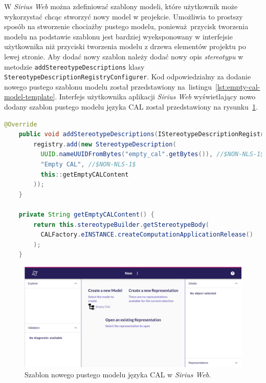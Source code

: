 W \emph{Sirius Web} można zdefiniować szablony modeli, które użytkownik może
wykorzystać chcąc stworzyć nowy model w projekcie. Umożliwia to prostszy
sposób na stworzenie chociażby pustego modelu, ponieważ przycisk tworzenia
modelu
na podstawie szablonu jest bardziej wyeksponowany w interfejsie użytkownika niż
przyciski tworzenia modelu z drzewa elementów projektu po lewej stronie.
Aby dodać nowy szablon należy dodać nowy opis \emph{stereotypu} w metodzie
\texttt{addStereotypeDescriptions} klasy
\texttt{StereotypeDescriptionRegistryConfigurer}. Kod odpowiedzialny za dodanie
nowego pustego szablonu modelu został przedstawiony
na~listingu~\ref{lst:empty-cal-model-template}. Interfejs użytkownika aplikacji
\emph{Sirius Web} wyświetlający nowo dodany szablon pustego modelu języka
\gls{CAL} został przedstawiony na
rysunku~\ref{rys:sirius-web-new-model-template}.

\begin{lstlisting}[float,
    floatplacement=!hb,
    language=Java,
    caption={Dodanie nowego pustego szablonu modelu języka CAL.},
    label={lst:empty-cal-model-template}]
    @Override
    public void addStereotypeDescriptions(IStereotypeDescriptionRegistry registry) {
        registry.add(new StereotypeDescription(
          UUID.nameUUIDFromBytes("empty_cal".getBytes()), //$NON-NLS-1$
          "Empty CAL", //$NON-NLS-1$
          this::getEmptyCALContent
        ));
    }

    private String getEmptyCALContent() {
        return this.stereotypeBuilder.getStereotypeBody(
          CALFactory.eINSTANCE.createComputationApplicationRelease()
        );
    }
\end{lstlisting}

\begin{figure}[!hb]
  \centering

  \includegraphics[width=0.95\linewidth]{./images/sirius-web-new-model-template.png}
  \caption{Szablon nowego pustego modelu języka
    \gls{CAL} w \emph{Sirius Web}.}\label{rys:sirius-web-new-model-template}
\end{figure}

